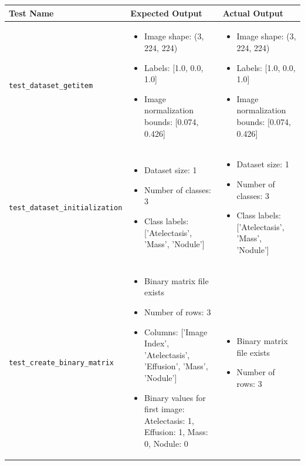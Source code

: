 \documentclass[12pt, titlepage]{article}
\begin{document}
\begin{table}[h!]
\begin{scriptsize}
\centering
\begin{tabular}{|p{4cm}|p{6cm}|p{6cm}|}
\hline
\textbf{Test Name} & \textbf{Expected Output} & \textbf{Actual Output} \\
\hline
\texttt{test\_dataset\_getitem} & 
\begin{itemize}
    \item Image shape: (3, 224, 224)
    \item Labels: [1.0, 0.0, 1.0]
    \item Image normalization bounds: [0.074, 0.426]
\end{itemize} & 
\begin{itemize}
    \item Image shape: (3, 224, 224)
    \item Labels: [1.0, 0.0, 1.0]
    \item Image normalization bounds: [0.074, 0.426]
\end{itemize} \\
\hline
\texttt{test\_dataset\_initialization} & 
\begin{itemize}
    \item Dataset size: 1
    \item Number of classes: 3
    \item Class labels: ['Atelectasis', 'Mass', 'Nodule']
\end{itemize} & 
\begin{itemize}
    \item Dataset size: 1
    \item Number of classes: 3
    \item Class labels: ['Atelectasis', 'Mass', 'Nodule']
\end{itemize} \\
\hline
\texttt{test\_create\_binary\_matrix} & 
\begin{itemize}
    \item Binary matrix file exists
    \item Number of rows: 3
    \item Columns: ['Image Index', 'Atelectasis', 'Effusion', 'Mass', 'Nodule']
    \item Binary values for first image: Atelectasis: 1, Effusion: 1, Mass: 0, Nodule: 0
\end{itemize} & 
\begin{itemize}
    \item Binary matrix file exists
    \item Number of rows: 3

\end{itemize}
\end{tabular}
\end{scriptsize}
\end{table}
\end{document}
